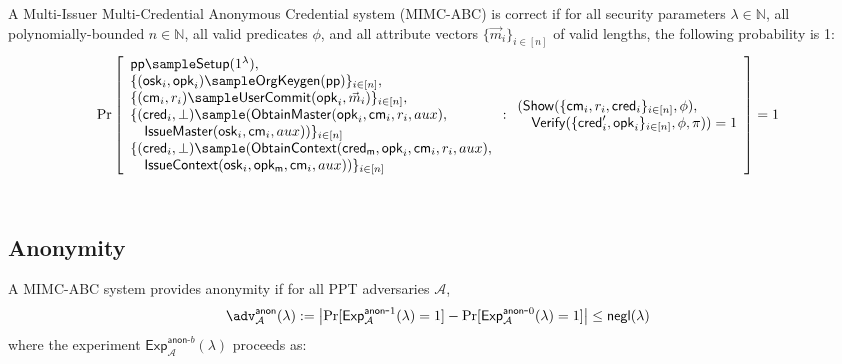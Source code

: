 \begin{definition}[Correctness]
A Multi-Issuer Multi-Credential Anonymous Credential system (MIMC-ABC) is correct if for all security parameters $\lambda \in \mathbb{N}$, all polynomially-bounded $n \in \mathbb{N}$, all valid predicates $\phi$, and all attribute vectors $\{\vec{m}_i\}_{i \in [n]}$ of valid lengths, the following probability is 1:
\[
        \Pr
            \left [
            \begin{array}{l}
                \ppar \sample \mathsf{Setup}(1^\lambda),\\
        \{(\mathsf{osk}_i, \mathsf{opk}_i) \sample \mathsf{OrgKeygen}(\ppar)\}_{i \in [n]},\\
        \{(\mathsf{cm}_i, r_i) \sample \mathsf{UserCommit}(\mathsf{opk}_i, \vec{m}_i)\}_{i \in [n]},\\
        \{(\mathsf{cred}_i, \bot) \sample (\mathsf{ObtainMaster}(\mathsf{opk}_i, \mathsf{cm}_i, r_i, aux),\\
        \quad\mathsf{IssueMaster}(\mathsf{osk}_i, \mathsf{cm}_i, aux))\}_{i \in [n]} \\
         \{(\mathsf{cred}_i, \bot) \sample (\mathsf{ObtainContext}(\mathsf{cred_m}, \mathsf{opk}_i, \mathsf{cm}_i, r_i, aux),\\
        \quad\mathsf{IssueContext}(\mathsf{osk}_i, \mathsf{opk_m}, \mathsf{cm}_i, aux))\}_{i \in [n]}
            \end{array}
                : 
                \begin{array}{l}
                   (\mathsf{Show}(\{\mathsf{cm}_i, r_i, \mathsf{cred}_i\}_{i \in [n]}, \phi),\\
                    \quad\mathsf{Verify}(\{\mathsf{cred}'_i, \mathsf{opk}_i\}_{i \in [n]}, \phi, \pi)) = 1
                \end{array}
                \right ]
             = 1
\]
\
\end{definition}









\newpage
\subsection{Anonymity} 

\begin{definition}
A MIMC-ABC system provides anonymity if for all PPT adversaries $\mathcal{A}$,
\[
\adv^{\mathsf{anon}}_{\mathcal{A}}(\lambda) := \left|\Pr[\mathsf{Exp}^{\mathsf{anon}\mbox{-}1}_{\mathcal{A}}(\lambda)=1] - \Pr[\mathsf{Exp}^{\mathsf{anon}\mbox{-}0}_{\mathcal{A}}(\lambda)=1]\right| \leq \negl
\]
where the experiment $\mathsf{Exp}^{\mathsf{anon}\mbox{-}b}_{\mathcal{A}}(\lambda)$ proceeds as:
\end{definition}

